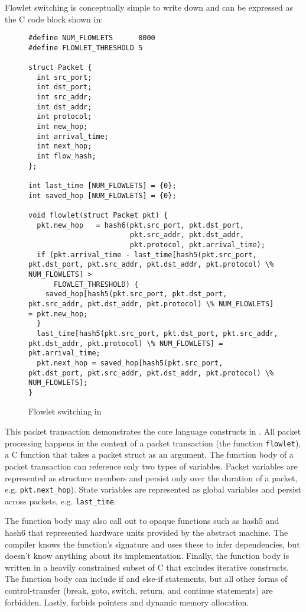 Flowlet switching is conceptually simple to write down and can be expressed
as the C code block shown in:
\begin{figure}
\begin{scriptsize}
\begin{lstlisting}
#define NUM_FLOWLETS      8000
#define FLOWLET_THRESHOLD 5

struct Packet {
  int src_port;
  int dst_port;
  int src_addr;
  int dst_addr;
  int protocol;
  int new_hop;
  int arrival_time;
  int next_hop;
  int flow_hash;
};

int last_time [NUM_FLOWLETS] = {0};
int saved_hop [NUM_FLOWLETS] = {0};

void flowlet(struct Packet pkt) {
  pkt.new_hop   = hash6(pkt.src_port, pkt.dst_port,
                        pkt.src_addr, pkt.dst_addr,
                        pkt.protocol, pkt.arrival_time);
  if (pkt.arrival_time - last_time[hash5(pkt.src_port, pkt.dst_port, pkt.src_addr, pkt.dst_addr, pkt.protocol) \% NUM_FLOWLETS] >
      FLOWLET_THRESHOLD) {
    saved_hop[hash5(pkt.src_port, pkt.dst_port, pkt.src_addr, pkt.dst_addr, pkt.protocol) \% NUM_FLOWLETS] = pkt.new_hop;
  }
  last_time[hash5(pkt.src_port, pkt.dst_port, pkt.src_addr, pkt.dst_addr, pkt.protocol) \% NUM_FLOWLETS] = pkt.arrival_time;
  pkt.next_hop = saved_hop[hash5(pkt.src_port, pkt.dst_port, pkt.src_addr, pkt.dst_addr, pkt.protocol) \% NUM_FLOWLETS];
}
\end{lstlisting}
\end{scriptsize}
\label{fig:flowlet}
\caption{Flowlet switching in \pktlanguage}
\end{figure}

This packet transaction demonstrates the core language constructs in
\pktlanguage. All packet processing happens in the context of a packet
transaction (the function \texttt{flowlet}), a C function that takes a packet
struct as an argument. The function body of a packet transaction can reference
only two types of variables. Packet variables are represented as structure
members and persist only over the duration of a packet, e.g.
\texttt{pkt.next\_hop}). State variables are represented as global variables
and persist across packets, e.g. \texttt{last\_time}.

The function body may also call out to opaque functions such as hash5 and hash6
that represented hardware units provided by the abstract machine. The
\pktlanguage compiler knows the function's signature and uses these to infer
dependencies, but doesn't know anything about its implementation. Finally, the
function body is written in a heavily constrained subset of C that excludes
iterative constructs. The function body can include if and else-if statements,
but all other forms of control-transfer (break, goto, switch, return, and
continue statements) are forbidden. Lastly, \pktlanguage forbids pointers and
dynamic memory allocation.

